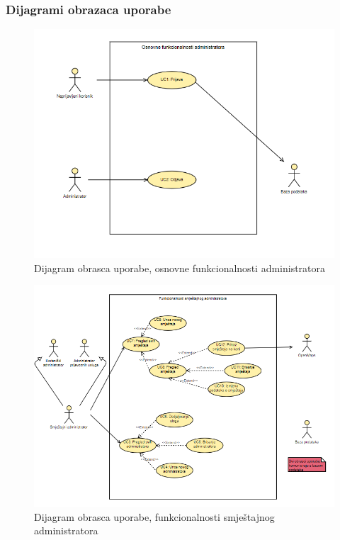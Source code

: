 				\subsubsection{Dijagrami obrazaca uporabe}
					
					\begin{figure}[H]
						\includegraphics[width=\textwidth]{slike/uc1.PNG} %
						\caption{Dijagram obrasca uporabe, osnovne funkcionalnosti administratora}
						\label{fig:uc1} %
					\end{figure}
					
					\begin{figure}[H]
						\includegraphics[width=\textwidth]{slike/uc2.PNG} %
						\caption{Dijagram obrasca uporabe, funkcionalnosti smještajnog administratora}
						\label{fig:uc2} %
					\end{figure}
					
